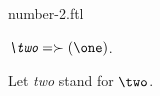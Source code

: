 \documentclass{stex}
\begin{document}
\begin{smodule}{number-2.ftl}



\begin{definition}[forthel,id=TwoDef]
  $\emph{\two} = \succ(\one)$.

  Let \emph{two} stand for $\two$.
\end{definition}

\end{smodule}
\end{document}
